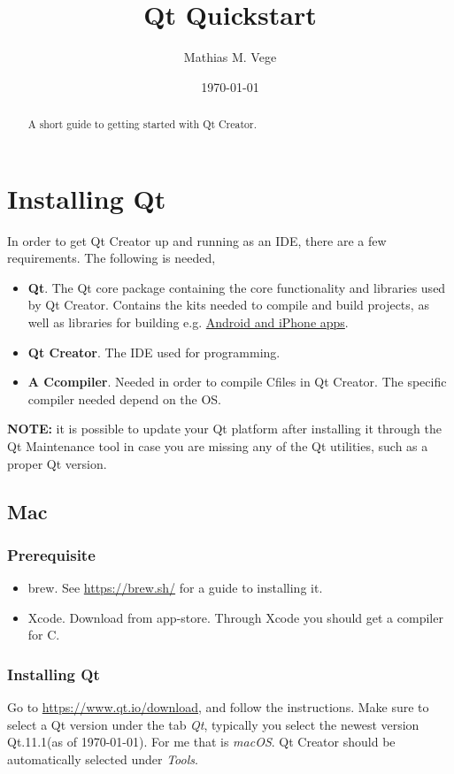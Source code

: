 \documentclass[11pt]{article}
\title{Qt Quickstart}
\author{Mathias M. Vege}
\date{\today}
\newcommand{\CC}{C\nolinebreak\hspace{-.05em}\raisebox{.4ex}{\tiny\bf +}\nolinebreak\hspace{-.10em}\raisebox{.4ex}{\tiny\bf +}}
\def\CC{{C\nolinebreak[4]\hspace{-.05em}\raisebox{.4ex}{\tiny\bf ++}}}
\begin{document}
\maketitle

\begin{abstract}
A short guide to getting started with Qt Creator.
\end{abstract}

\tableofcontents

\section{Installing Qt} \label{section:installing-qt}
In order to get Qt Creator up and running as an IDE, there are a few requirements. The following is needed,
\begin{itemize}
    \item \textbf{Qt}. The Qt core package containing the core functionality and libraries used by Qt Creator. Contains the kits needed to compile and build projects, as well as libraries for building e.g. \href{http://doc.qt.io/qt-5/ios-support.html}{Android and iPhone apps}.
    \item \textbf{Qt Creator}. The IDE used for programming.
    \item \textbf{A \CC compiler}. Needed in order to compile \CC files in Qt Creator. The specific compiler needed depend on the OS.
\end{itemize}

\textbf{NOTE:} it is possible to update your Qt platform after installing it through the Qt Maintenance tool in case you are missing any of the Qt utilities, such as a proper Qt version. 

\subsection{Mac}
\subsubsection{Prerequisite}
\begin{itemize}
    \item brew. See \url{https://brew.sh/} for a guide to installing it.
    \item Xcode. Download from app-store. Through Xcode you should get a compiler for \CC.
\end{itemize}
\subsubsection{Installing Qt}
Go to \url{https://www.qt.io/download}, and follow the instructions. Make sure to select a Qt version under the tab \emph{Qt}, typically you select the newest version Qt.11.1(as of \today). For me that is \emph{macOS}. Qt Creator should be automatically selected under \emph{Tools}.
\end{document}
